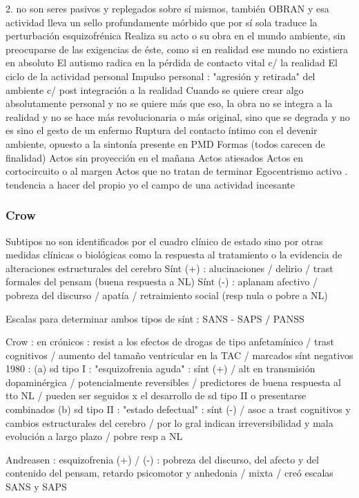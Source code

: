 2. no son seres pasivos y replegados sobre sí mismos, también OBRAN y esa actividad lleva un sello profundamente mórbido que por sí sola traduce la perturbación esquizofrénica Realiza su acto o su obra en el mundo ambiente, sin preocuparse de las exigencias de éste, como si en realidad ese mundo no existiera en absoluto El autismo radica en la pérdida de contacto vital c/ la realidad El ciclo de la actividad personal Impulso personal : "agresión y retirada" del ambiente c/ post integración a la realidad Cuando se quiere crear algo absolutamente personal y no se quiere más que eso, la obra no se integra a la realidad y no se hace más revolucionaria o más original, sino que se degrada y no es sino el gesto de un enfermo Ruptura del contacto íntimo con el devenir ambiente, opuesto a la sintonía presente en PMD Formas (todos carecen de finalidad) Actos sin proyección en el mañana Actos atiesados Actos en cortocircuito o al margen Actos que no tratan de terminar Egocentrismo activo . tendencia a hacer del propio yo el campo de una actividad incesante

\subsubsection*{Crow}

Subtipos no son identificados por el cuadro clínico de estado sino por otras medidas clínicas o biológicas como la respuesta al tratamiento o la evidencia de alteraciones estructurales del cerebro Sínt (+) : alucinaciones / delirio / trast formales del pensam (buena respuesta a NL) Sínt (-) : aplanam afectivo / pobreza del discurso / apatía / retraimiento social (resp nula o pobre a NL)

Escalas para determinar ambos tipos de sínt : SANS - SAPS / PANSS

Crow : en crónicos : resist a los efectos de drogas de tipo anfetamínico / trast cognitivos / aumento del tamaño ventricular en la TAC / marcados sínt negativos 1980 : (a) sd tipo I : "esquizofrenia aguda" : sínt (+) / alt en transmisión dopaminérgica / potencialmente reversibles / predictores de buena respuesta al tto NL / pueden ser seguidos x el desarrollo de sd tipo II o presentarse combinados (b) sd tipo II : "estado defectual" : sínt (-) / asoc a trast cognitivos y cambios estructurales del cerebro / por lo gral indican irreversibilidad y mala evolución a largo plazo / pobre resp a NL

Andreasen : esquizofrenia (+) / (-) : pobreza del discurso, del afecto y del contenido del pensam, retardo psicomotor y anhedonia / mixta / creó escalas SANS y SAPS

